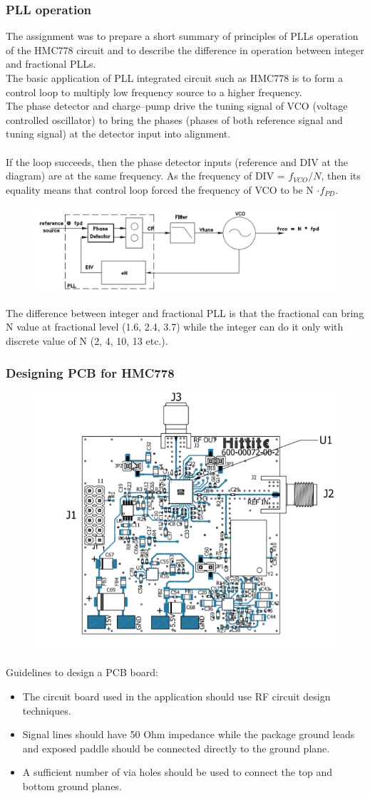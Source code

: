 \documentclass[eng,printmode]{mgr}
\begin{document}
\subsubsection{PLL operation}
The assignment was to prepare a short summary of principles of PLLs operation of the HMC778 circuit and to describe the difference in operation between integer and fractional PLLs.
\\
The basic application of PLL integrated circuit such as HMC778 is to form a control loop to multiply low frequency source to a higher frequency.\\
The phase detector and charge--pump drive the tuning signal of VCO (voltage controlled oscillator) to bring the phases (phases of both reference signal and tuning signal) at the detector input into alignment.\\
\\If the loop succeeds, then the phase detector inputs (reference and DIV at the diagram) are at the same frequency. 
As the frequency of DIV = $f_{VCO} / N$, then its equality means that control loop forced the frequency of VCO to be N $\cdot f_{PD}$.
\begin{figure}[!h]
	\centering
	\includegraphics[width=0.7\linewidth]{pll3}
	\label{fig:pll3}
\end{figure}
The difference between integer and fractional PLL is that the fractional can bring N value at fractional level (1.6, 2.4, 3.7) while the integer can do it only with discrete value of N (2, 4, 10, 13 etc.).
\newpage
\subsubsection{Designing PCB for HMC778}
\begin{figure}[!h]
	\centering
	\includegraphics[width=0.3\linewidth]{pll2}
	\label{fig:pll2}
\end{figure}
Guidelines to design a PCB board:
\begin{itemize}
	\item The circuit board used in the application should use RF circuit design techniques. 
	\item Signal lines should have
	50 Ohm impedance while the package ground leads and exposed paddle should be connected directly
	to the ground plane. 
	\item A sufficient number of via holes should be used to connect the
	top and bottom ground planes.
\end{itemize}
\end{document}
